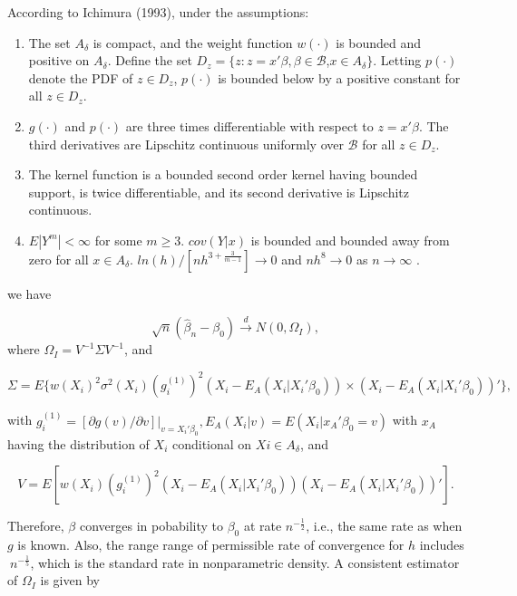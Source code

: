 \documentclass[a4paper]{article}
\begin{document}
\begin{theorem}
According to Ichimura (1993), under the assumptions:

\begin{enumerate}[label=(\roman*)]
	\item The set $A_\delta$ is compact, and the weight function $w(\cdot)$ is bounded and positive on $A_\delta$. Define the set $D_z = \{ z : z = x'\beta, \beta \in \mathcal{B}$,$ x \in A_\delta\}$. Letting $p(\cdot)$ denote the PDF of $z \in D_z$, $p(\cdot)$ is bounded below by a positive constant for all $z \in D_z$.
	\item $g(\cdot)$ and $p(\cdot)$ are three times differentiable with respect to $z = x'\beta$. The third derivatives are Lipschitz continuous uniformly over $\mathcal{B}$ for all $z \in D_z$.
	\item The kernel function is a bounded second order kernel having bounded support, is twice differentiable, and its second derivative is Lipschitz continuous.
	\item $E|Y^m| < \infty$ for some $m \geq 3$. $cov(Y|x)$ is bounded and bounded away from zero for all $x \in A_\delta$. $ln(h)/[nh^{3 + \frac{3}{m-1}}] \rightarrow 0$ and $nh^8 \rightarrow 0$ as $n \rightarrow \infty $ .
	
\end{enumerate}

we have

\[ \sqrt{n}(\hat{\beta}_n - \beta_0) \stackrel{d}{\rightarrow} N(0,\Omega_I), \] where $\Omega_I = V^{-1}\Sigma V^{-1}$, and

\[\Sigma = E\{w(X_i)^2\sigma^2(X_i)(g_i^{(1)})^2(X_i - E_A(X_i|X_i'\beta_0)) \times (X_i - E_A(X_i|X_i'\beta_0))'\},\]

with $g_i^{(1)} = [\partial g(v)/\partial v]|_{v = X_i'\beta_0}, E_A(X_i|v) = E(X_i|x_A'\beta_0 = v)$ with $x_A$ having the distribution of $X_i$ conditional on $Xi \in A_\delta$, and

\[ V = E[w(X_i)(g_i^{(1)})^2(X_i - E_A(X_i|X_i'\beta_0))(X_i - E_A(X_i|X_i'\beta_0))'].\]

\end{theorem}

Therefore, $\beta$ converges in pobability to $\beta_0$ at rate $n^{-\frac{1}{2}}$, i.e., the same rate as when $g$ is known. Also, the range range of permissible rate of convergence for $h$ includes $~n^{-\frac{1}{5}}$, which is the standard rate in nonparametric density.
A consistent estimator of $\Omega_I$ is given by
\end{document}
